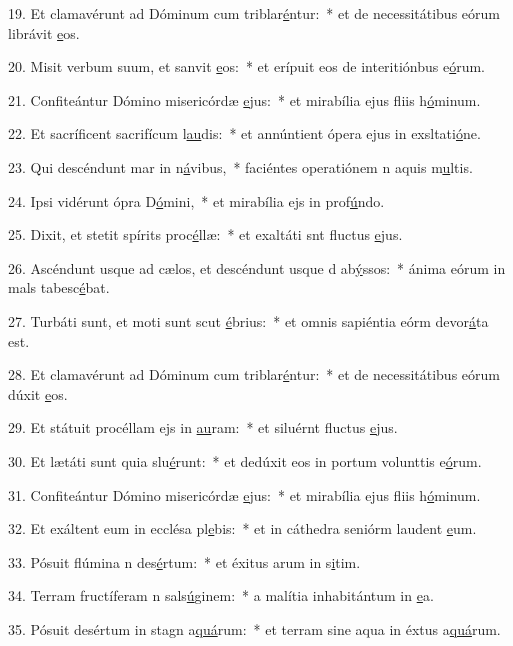 19. Et clamavérunt ad Dóminum cum triblar\uline{é}ntur:~* et de necessitátibus eórum librávit \uline{e}os.\par 
20. Misit verbum suum, et sanvit \uline{e}os:~* et erípuit eos de interitiónbus e\uline{ó}rum.\par 
21. Confiteántur Dómino misericórdæ \uline{e}jus:~* et mirabília ejus fliis h\uline{ó}minum.\par 
22. Et sacríficent sacrifícum l\uline{au}dis:~* et annúntient ópera ejus in exsltati\uline{ó}ne.\par 
23. Qui descéndunt mar in n\uline{á}vibus,~* faciéntes operatiónem n aquis m\uline{u}ltis.\par 
24. Ipsi vidérunt ópra D\uline{ó}mini,~* et mirabília ejs in prof\uline{ú}ndo.\par 
25. Dixit, et stetit spírits proc\uline{é}llæ:~* et exaltáti snt fluctus \uline{e}jus.\par 
26. Ascéndunt usque ad cælos, et descéndunt usque d ab\uline{ý}ssos:~* ánima eórum in mals tabesc\uline{é}bat.\par 
27. Turbáti sunt, et moti sunt scut \uline{é}brius:~* et omnis sapiéntia eórm devor\uline{á}ta est.\par 
28. Et clamavérunt ad Dóminum cum triblar\uline{é}ntur:~* et de necessitátibus eórum dúxit \uline{e}os.\par 
29. Et státuit procéllam ejs in \uline{au}ram:~* et siluérnt fluctus \uline{e}jus.\par 
30. Et lætáti sunt quia slu\uline{é}runt:~* et dedúxit eos in portum volunttis e\uline{ó}rum.\par 
31. Confiteántur Dómino misericórdæ \uline{e}jus:~* et mirabília ejus fliis h\uline{ó}minum.\par 
32. Et exáltent eum in ecclésa pl\uline{e}bis:~* et in cáthedra seniórm laudent \uline{e}um.\par 
33. Pósuit flúmina n des\uline{é}rtum:~* et éxitus arum in s\uline{i}tim.\par 
34. Terram fructíferam n sals\uline{ú}ginem:~* a malítia inhabitántum in \uline{e}a.\par 
35. Pósuit desértum in stagn a\uline{quá}rum:~* et terram sine aqua in éxtus a\uline{quá}rum.\par 
